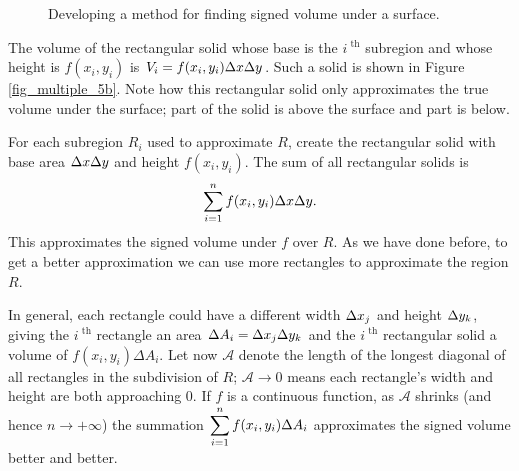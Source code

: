\begin{figure}
\centering
\qquad
{}
\caption{Developing a method for finding signed volume under a surface. }
\end{figure}



The volume of the rectangular solid whose base is the $i^\text{ th}$ subregion and whose height is $f(x_i,y_i)$ is $V_i=f(x_i,y_i)\Delta x\Delta y$. Such a  solid is shown in Figure \ref{fig_multiple_5b}. Note how this rectangular solid only approximates the true volume under the surface; part of the solid is above the surface and part is below.

For each subregion $R_i$ used to approximate $R$, create the rectangular solid with base area $\Delta x\Delta y$ and height $f(x_i,y_i)$. 
The sum of all rectangular solids is $$\displaystyle \sum_{i=1}^n f(x_i,y_i)\Delta x\Delta y.$$ This approximates the signed volume under $f$ over $R$. As we have done before, to get a better approximation we can use more rectangles to approximate the region $R$.

In general, each rectangle could have a different width $\Delta x_j$ and height $\Delta y_k$, giving the $i^\text{ th}$ rectangle an area $\Delta A_i = \Delta x_j\Delta y_k$ and the $i^\text{ th}$ rectangular solid a volume of $f(x_i,y_i)\Delta A_i$. Let now $\mathcal{A}$ denote the length of the longest diagonal of all rectangles in the subdivision of $R$; $\mathcal{A}\to 0$ means each rectangle's width and height are both approaching 0. If $f$ is a continuous function, as $\mathcal{A}$ shrinks (and hence $n\to +\infty$) the summation $\displaystyle \sum_{i=1}^n f(x_i,y_i)\Delta A_i$ approximates the signed volume better and better. 

